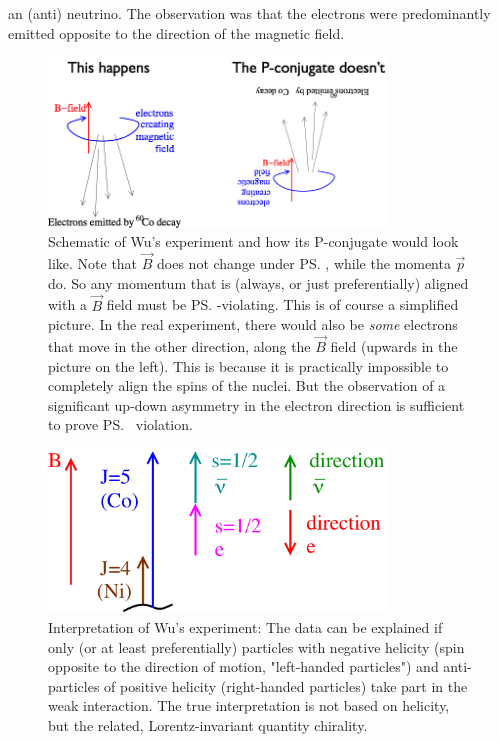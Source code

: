  an (anti) neutrino. The observation was that the electrons were
 predominantly emitted opposite to the direction of the magnetic
 field. 
\begin{figure}
\centering
\includegraphics[width=0.8\textwidth]{fig/C_P_CP/0_MadamWuSchematic}
\caption{Schematic of Wu's experiment and how its P-conjugate would look like. Note that $\vec{B}$ does not change under \ps, while the momenta $\vec{p}$ do. So any momentum that is (always, or just preferentially) aligned with a $\vec{B}$ field must be \ps-violating. This is of course a simplified picture. In the real experiment, there would also be \emph{some} electrons that move in the other direction, along the $\vec{B}$ field (upwards in the picture on the left). This is because it is practically impossible to completely align the spins of the nuclei. But the observation of a significant up-down asymmetry in the electron direction is sufficient to prove \ps\ violation.
\label{fig:WuSchematic}}
\end{figure}
\begin{figure}
\centering
\includegraphics[width=0.8\textwidth]{fig/C_P_CP/0_MadamWuInterpretation}
\caption{Interpretation of Wu's experiment: The data can be explained if only (or at least preferentially) particles with negative helicity (spin opposite to the direction of motion, "left-handed particles") and anti-particles of positive helicity (right-handed particles) take part in the weak interaction. The true interpretation is not based on helicity, but the related, Lorentz-invariant quantity chirality.
\label{fig:WuInterpretation}}
\end{figure}



